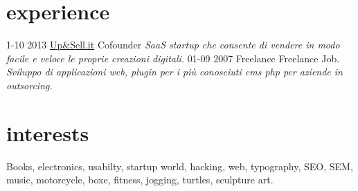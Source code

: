 \documentclass[print]{cv}
\begin{document}
\section{experience}

\begin{entrylist}
  \entry
    {1-10 2013}
     {\href{http://www.23learn.com}{Up\&Sell.it}}
    {Cofounder}
    {\emph{SaaS startup che consente di vendere in modo facile e veloce le proprie
    creazioni digitali. }}
  \entry
    {01-09 2007}
    {Freelance}
    {Freelance Job.}
    {\emph{Sviluppo di applicazioni web, plugin per i più conosciuti cms php per
    aziende in outsorcing.}}
\end{entrylist}

\section{interests}

Books, electronics, usabilty, startup world, hacking, web, typography, SEO, SEM, music, motorcycle, boxe, fitness, jogging,
turtles, sculpture art.
\end{document}
